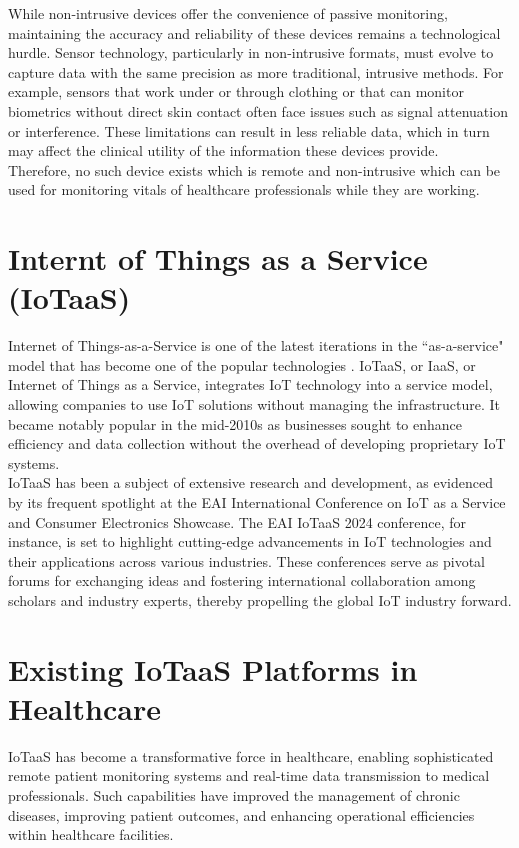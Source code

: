 \noindent While non-intrusive devices offer the convenience of passive monitoring, maintaining the accuracy and reliability of these devices remains a technological hurdle. Sensor technology, particularly in non-intrusive formats, must evolve to capture data with the same precision as more traditional, intrusive methods. For example, sensors that work under or through clothing or that can monitor biometrics without direct skin contact often face issues such as signal attenuation or interference. These limitations can result in less reliable data, which in turn may affect the clinical utility of the information these devices provide.\\


\noindent Therefore, no such device exists which is remote and non-intrusive which can be used for monitoring vitals of healthcare professionals while they are working.

\section{Internt of Things as a Service (IoTaaS)}
Internet of Things-as-a-Service is one of the latest iterations in the ``as-a-service" model that has become one of the popular technologies \cite{45}. IoTaaS, or IaaS, or Internet of Things as a Service, integrates IoT technology into a service model, allowing companies to use IoT solutions without managing the infrastructure. It became notably popular in the mid-2010s as businesses sought to enhance efficiency and data collection without the overhead of developing proprietary IoT systems. \\

\noindent IoTaaS has been a subject of extensive research and development, as evidenced by its frequent spotlight at the EAI International Conference on IoT as a Service and Consumer Electronics Showcase. The EAI IoTaaS 2024 conference, for instance, is set to highlight cutting-edge advancements in IoT technologies and their applications across various industries. These conferences serve as pivotal forums for exchanging ideas and fostering international collaboration among scholars and industry experts, thereby propelling the global IoT industry forward.\cite{46} 

\section{Existing IoTaaS Platforms in Healthcare}
IoTaaS has become a transformative force in healthcare, enabling sophisticated remote patient monitoring systems and real-time data transmission to medical professionals. Such capabilities have improved the management of chronic diseases, improving patient outcomes, and enhancing operational efficiencies within healthcare facilities. \\

